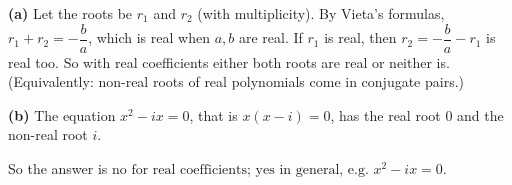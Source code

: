 \textbf{(a)} Let the roots be $r_1$ and $r_2$ (with multiplicity). By Vieta's formulas, $r_1+r_2=-\dfrac {b}{a}$, which is real when $a,b$ are real. If $r_1$ is real, then $r_2=-\dfrac {b}{a}-r_1$ is real too. So with real coefficients either both roots are real or neither is. (Equivalently: non-real roots of real polynomials come in conjugate pairs.)

\textbf{(b)} The equation $x^2-ix=0$, that is $x(x-i)=0$, has the real root $0$ and the non-real root $i$.

So the answer is $\boxed{\text{no for real coefficients; yes in general, e.g. } x^2-ix=0}$.
